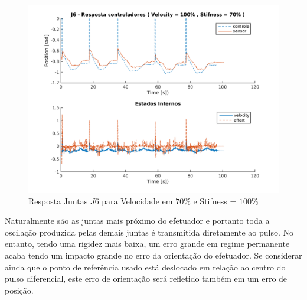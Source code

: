 \vspace{1cm}

\begin{figure}[H]
    \centering
    \includegraphics[width=0.6\linewidth,trim={2cm 1cm 2cm 2cm}]{tex/figs/squareStiffJ9stateEval_J6v100s70.png}
    \caption{Resposta Juntas $J6$ para Velocidade em $70\%$ e Stifness = $100\%$ }
    \label{fig:squareStiffJ9stateEval_J6v100s70}
\end{figure}

Naturalmente são as juntas mais próximo do efetuador e portanto toda a oscilação produzida pelas demais juntas é transmitida diretamente ao pulso. No entanto, tendo uma rigidez mais baixa, um erro grande em regime permanente acaba tendo um impacto grande no erro da orientação do efetuador. Se considerar ainda que o ponto de referência usado está deslocado em relação ao centro do pulso diferencial, este erro de orientação será refletido também em um erro de posição.

%          

%          

